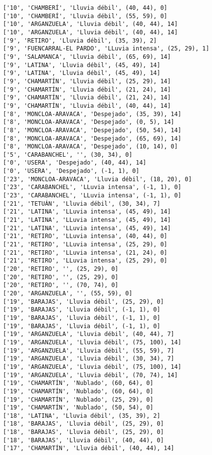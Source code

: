 \documentclass[11pt]{article}
\begin{document}
\begin{Verbatim}[commandchars=\\\{\}]
['10', 'CHAMBERÍ', 'Lluvia débil', (40, 44), 0]
['10', 'CHAMBERÍ', 'Lluvia débil', (55, 59), 0]
['10', 'ARGANZUELA', 'Lluvia débil', (40, 44), 14]
['10', 'ARGANZUELA', 'Lluvia débil', (40, 44), 14]
['9', 'RETIRO', 'Lluvia débil', (35, 39), 2]
['9', 'FUENCARRAL-EL PARDO', 'LLuvia intensa', (25, 29), 1]
['9', 'SALAMANCA', 'Lluvia débil', (65, 69), 14]
['9', 'LATINA', 'Lluvia débil', (45, 49), 14]
['9', 'LATINA', 'Lluvia débil', (45, 49), 14]
['9', 'CHAMARTÍN', 'Lluvia débil', (25, 29), 14]
['9', 'CHAMARTÍN', 'Lluvia débil', (21, 24), 14]
['9', 'CHAMARTÍN', 'Lluvia débil', (21, 24), 14]
['9', 'CHAMARTÍN', 'Lluvia débil', (40, 44), 14]
['8', 'MONCLOA-ARAVACA', 'Despejado', (35, 39), 14]
['8', 'MONCLOA-ARAVACA', 'Despejado', (0, 5), 14]
['8', 'MONCLOA-ARAVACA', 'Despejado', (50, 54), 14]
['8', 'MONCLOA-ARAVACA', 'Despejado', (65, 69), 14]
['8', 'MONCLOA-ARAVACA', 'Despejado', (10, 14), 0]
['5', 'CARABANCHEL', '', (30, 34), 0]
['0', 'USERA', 'Despejado', (40, 44), 14]
['0', 'USERA', 'Despejado', (-1, 1), 0]
['23', 'MONCLOA-ARAVACA', 'Lluvia débil', (18, 20), 0]
['23', 'CARABANCHEL', 'LLuvia intensa', (-1, 1), 0]
['23', 'CARABANCHEL', 'LLuvia intensa', (-1, 1), 0]
['21', 'TETUÁN', 'Lluvia débil', (30, 34), 7]
['21', 'LATINA', 'LLuvia intensa', (45, 49), 14]
['21', 'LATINA', 'LLuvia intensa', (45, 49), 14]
['21', 'LATINA', 'LLuvia intensa', (45, 49), 14]
['21', 'RETIRO', 'LLuvia intensa', (40, 44), 0]
['21', 'RETIRO', 'LLuvia intensa', (25, 29), 0]
['21', 'RETIRO', 'LLuvia intensa', (21, 24), 0]
['21', 'RETIRO', 'LLuvia intensa', (25, 29), 0]
['20', 'RETIRO', '', (25, 29), 0]
['20', 'RETIRO', '', (25, 29), 0]
['20', 'RETIRO', '', (70, 74), 0]
['20', 'ARGANZUELA', '', (55, 59), 0]
['19', 'BARAJAS', 'Lluvia débil', (25, 29), 0]
['19', 'BARAJAS', 'Lluvia débil', (-1, 1), 0]
['19', 'BARAJAS', 'Lluvia débil', (-1, 1), 0]
['19', 'BARAJAS', 'Lluvia débil', (-1, 1), 0]
['19', 'ARGANZUELA', 'Lluvia débil', (40, 44), 7]
['19', 'ARGANZUELA', 'Lluvia débil', (75, 100), 14]
['19', 'ARGANZUELA', 'Lluvia débil', (55, 59), 7]
['19', 'ARGANZUELA', 'Lluvia débil', (30, 34), 7]
['19', 'ARGANZUELA', 'Lluvia débil', (75, 100), 14]
['19', 'ARGANZUELA', 'Lluvia débil', (70, 74), 14]
['19', 'CHAMARTÍN', 'Nublado', (60, 64), 0]
['19', 'CHAMARTÍN', 'Nublado', (60, 64), 0]
['19', 'CHAMARTÍN', 'Nublado', (25, 29), 0]
['19', 'CHAMARTÍN', 'Nublado', (50, 54), 0]
['18', 'LATINA', 'Lluvia débil', (35, 39), 2]
['18', 'BARAJAS', 'Lluvia débil', (25, 29), 0]
['18', 'BARAJAS', 'Lluvia débil', (25, 29), 0]
['18', 'BARAJAS', 'Lluvia débil', (40, 44), 0]
['17', 'CHAMARTÍN', 'Lluvia débil', (40, 44), 14]

\end{Verbatim}
\end{document}
